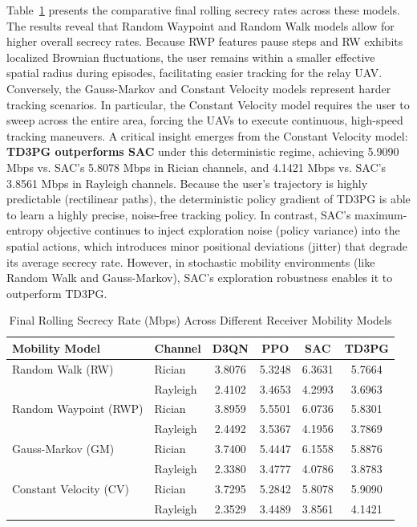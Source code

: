 \documentclass[journal,onecolumn]{IEEEtran}
\begin{document}
Table~\ref{tab:mobility_comparison} presents the comparative final rolling secrecy rates across these models.
The results reveal that Random Waypoint and Random Walk models allow for higher overall secrecy rates. Because RWP features pause steps and RW exhibits localized Brownian fluctuations, the user remains within a smaller effective spatial radius during episodes, facilitating easier tracking for the relay UAV.
Conversely, the Gauss-Markov and Constant Velocity models represent harder tracking scenarios. In particular, the Constant Velocity model requires the user to sweep across the entire area, forcing the UAVs to execute continuous, high-speed tracking maneuvers.
A critical insight emerges from the Constant Velocity model: \textbf{TD3PG outperforms SAC} under this deterministic regime, achieving 5.9090 Mbps vs. SAC's 5.8078 Mbps in Rician channels, and 4.1421 Mbps vs. SAC's 3.8561 Mbps in Rayleigh channels. Because the user's trajectory is highly predictable (rectilinear paths), the deterministic policy gradient of TD3PG is able to learn a highly precise, noise-free tracking policy. In contrast, SAC's maximum-entropy objective continues to inject exploration noise (policy variance) into the spatial actions, which introduces minor positional deviations (jitter) that degrade its average secrecy rate. However, in stochastic mobility environments (like Random Walk and Gauss-Markov), SAC's exploration robustness enables it to outperform TD3PG.

\begin{table}[h!]
\caption{Final Rolling Secrecy Rate (Mbps) Across Different Receiver Mobility Models}
\centering
\begin{tabular}{llcccc}
\toprule
\textbf{Mobility Model} & \textbf{Channel} & \textbf{D3QN} & \textbf{PPO} & \textbf{SAC} & \textbf{TD3PG} \\
\midrule
Random Walk (RW)       & Rician   & 3.8076 & 5.3248 & 6.3631 & 5.7664 \\
                       & Rayleigh & 2.4102 & 3.4653 & 4.2993 & 3.6963 \\
\midrule
Random Waypoint (RWP)  & Rician   & 3.8959 & 5.5501 & 6.0736 & 5.8301 \\
                       & Rayleigh & 2.4492 & 3.5367 & 4.1956 & 3.7869 \\
\midrule
Gauss-Markov (GM)      & Rician   & 3.7400 & 5.4447 & 6.1558 & 5.8876 \\
                       & Rayleigh & 2.3380 & 3.4777 & 4.0786 & 3.8783 \\
\midrule
Constant Velocity (CV) & Rician   & 3.7295 & 5.2842 & 5.8078 & 5.9090 \\
                       & Rayleigh & 2.3529 & 3.4489 & 3.8561 & 4.1421 \\
\bottomrule
\end{tabular}
\label{tab:mobility_comparison}
\end{table}
\end{document}
